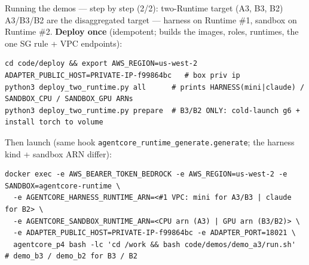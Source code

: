 \documentclass[aspectratio=169]{beamer}
\begin{document}
\begin{frame}[fragile]{Running the demos --- step by step (2/2): two-Runtime target (A3, B3, B2)}
  \footnotesize A3/B3/B2 are the disaggregated target --- harness on Runtime \#1, sandbox on Runtime \#2.
  \textbf{Deploy once} (idempotent; builds the images, roles, runtimes, the one SG rule + VPC endpoints):
\begin{lstlisting}[basicstyle=\ttfamily\scriptsize]
cd code/deploy && export AWS_REGION=us-west-2 ADAPTER_PUBLIC_HOST=PRIVATE-IP-f99864bc   # box priv ip
python3 deploy_two_runtime.py all      # prints HARNESS(mini|claude) / SANDBOX_CPU / SANDBOX_GPU ARNs
python3 deploy_two_runtime.py prepare  # B3/B2 ONLY: cold-launch g6 + install torch to volume
\end{lstlisting}
  \vspace{-0.3em}Then launch (same hook \texttt{agentcore\_runtime\_generate.generate}; the harness kind + sandbox ARN differ):
\begin{lstlisting}[basicstyle=\ttfamily\scriptsize]
docker exec -e AWS_BEARER_TOKEN_BEDROCK -e AWS_REGION=us-west-2 -e SANDBOX=agentcore-runtime \
  -e AGENTCORE_HARNESS_RUNTIME_ARN=<#1 VPC: mini for A3/B3 | claude for B2> \
  -e AGENTCORE_SANDBOX_RUNTIME_ARN=<CPU arn (A3) | GPU arn (B3/B2)> \
  -e ADAPTER_PUBLIC_HOST=PRIVATE-IP-f99864bc -e ADAPTER_PORT=18021 \
  agentcore_p4 bash -lc 'cd /work && bash code/demos/demo_a3/run.sh'   # demo_b3 / demo_b2 for B3 / B2
\end{lstlisting}
\end{frame}
\end{document}
